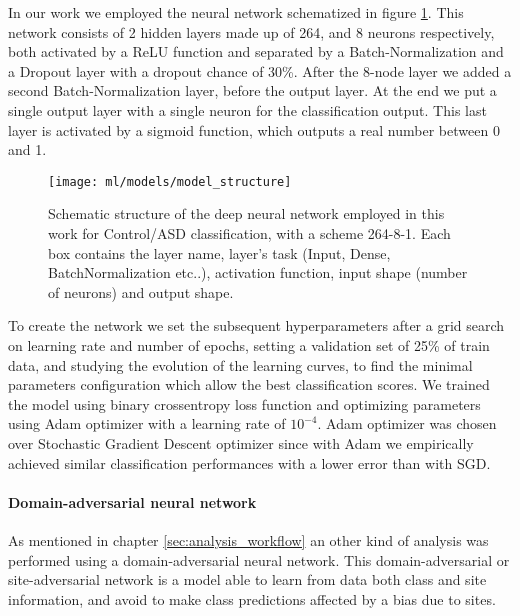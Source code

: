 \documentclass[11pt]{report}
\begin{document}
In our work we employed the neural network schematized in figure \ref{fig:model_structure}.
This network consists of 2 hidden layers made up of 264, and 8 neurons respectively, both activated by a ReLU function and separated by a Batch-Normalization and a Dropout layer with a dropout chance of 30\%.
After the 8-node layer we added a second Batch-Normalization layer, before the output layer.
At the end we put a single output layer with a single neuron for the classification output.
This last layer is activated by a sigmoid function, which outputs a real number between 0 and 1.



\begin{figure}[h!]
\centering
\texttt{[image: ml/models/model\_structure]}
\caption{Schematic structure of the deep neural network employed in this work for Control/ASD classification, with a scheme 264-8-1.
Each box contains the layer name, layer's task (Input, Dense, BatchNormalization etc..), activation function, input shape (number of neurons) and output shape.}
\label{fig:model_structure}
\end{figure}


To create the network we set the subsequent hyperparameters after a grid search on learning rate and number of epochs, setting a validation set of 25\% of train data, and studying the evolution of the learning curves, to find the minimal parameters configuration which allow the best classification scores.
We trained the model using binary crossentropy loss function and optimizing parameters using Adam optimizer with a learning rate of $10^{-4}$.
Adam optimizer was chosen over Stochastic Gradient Descent optimizer since with Adam we empirically achieved similar classification performances with a lower error than with SGD.

\paragraph{Domain-adversarial neural network}\hfill

As mentioned in chapter \ref{sec:analysis_workflow} an other kind of analysis was performed using a domain-adversarial neural network.
This domain-adversarial or site-adversarial network is a model able to learn from data both class and site information, and avoid to make class predictions affected by a bias due to sites.
\end{document}
